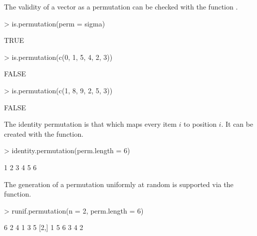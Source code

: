\documentclass[article,nojss]{jss}
\begin{document}
The validity of a vector as a permutation can be checked with the function .
\begin{Schunk}
\begin{Sinput}
> is.permutation(perm = sigma)
\end{Sinput}
\begin{Soutput}
[1] TRUE
\end{Soutput}
\begin{Sinput}
> is.permutation(c(0, 1, 5, 4, 2, 3))
\end{Sinput}
\begin{Soutput}
[1] FALSE
\end{Soutput}
\begin{Sinput}
> is.permutation(c(1, 8, 9, 2, 5, 3))
\end{Sinput}
\begin{Soutput}
[1] FALSE
\end{Soutput}
\end{Schunk}

The identity permutation is that which maps every item $i$ to position $i$. It can be created with the  function.
\begin{Schunk}
\begin{Sinput}
> identity.permutation(perm.length = 6)
\end{Sinput}
\begin{Soutput}
[1] 1 2 3 4 5 6
\end{Soutput}
\end{Schunk}
The generation of a permutation uniformly at random is supported via the  function. 
\begin{Schunk}
\begin{Sinput}
> runif.permutation(n = 2, perm.length = 6)
\end{Sinput}
\begin{Soutput}
     [,1] [,2] [,3] [,4] [,5] [,6]
[1,]    6    2    4    1    3    5
[2,]    1    5    6    3    4    2
\end{Soutput}
\end{Schunk}
\end{document}
